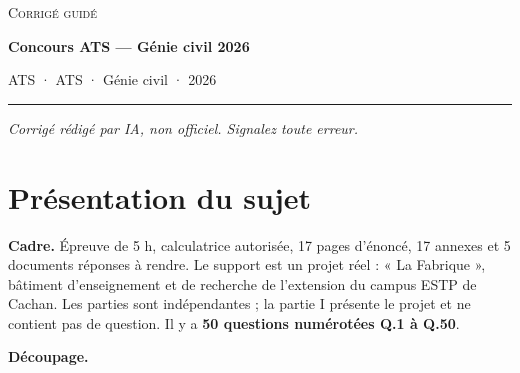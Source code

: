 \documentclass[11pt,a4paper]{article}
\begin{document}
\thispagestyle{plain}
\begin{center}
  {\small\scshape Corrigé guidé}\par\smallskip
  {\LARGE\bfseries Concours ATS — Génie civil 2026\par}\medskip
  {\large ATS · ATS · Génie civil · 2026\par}
\end{center}
\vspace{2pt}\hrule\vspace{8pt}

\emph{Corrigé rédigé par IA, non officiel. Signalez toute erreur.}

\hypertarget{pruxe9sentation-du-sujet}{%
\section{Présentation du sujet}\label{pruxe9sentation-du-sujet}}

\textbf{Cadre.} Épreuve de 5 h, calculatrice autorisée, 17 pages d'énoncé, 17 annexes et 5 documents réponses à rendre. Le support est un projet réel : « La Fabrique », bâtiment d'enseignement et de recherche de l'extension du campus ESTP de Cachan. Les parties sont indépendantes ; la partie I présente le projet et ne contient pas de question. Il y a \textbf{50 questions numérotées Q.1 à Q.50}.

\textbf{Découpage.}
\end{document}
